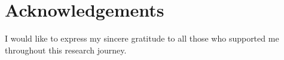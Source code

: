 \chapter*{Acknowledgements}


I would like to express my sincere gratitude to all those who
supported me throughout this research journey.

\endinput

